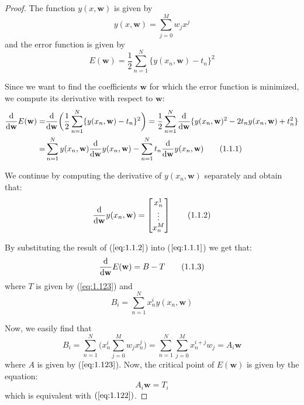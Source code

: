 \begin{proof}
    The function $y(x, \mathbf{w})$ is given by
    \begin{equation*}
        y(x, \mathbf{w}) = \sum_{j = 0}^M w_j x^j
        \tag{1.1}\label{eq:1.1}
    \end{equation*}
    and the error function is given by
    \begin{equation*}
        E(\mathbf{w}) = \frac{1}{2} \sum_{n = 1}^N \{y(x_n, \mathbf{w}) - t_n\}^2
        \tag{1.2}\label{eq:1.2}
    \end{equation*}

    Since we want to find the coefficients $\mathbf{w}$ for which
    the error function is minimized, we compute its derivative with
    respect to $\mathbf{w}$:
    \begin{align*}
        \dv{\mathbf{w}} E(\mathbf{w}) 
        =& \dv{\mathbf{w}} \bigg(\frac{1}{2} \sum_{n = 1}^N \{y(x_n, \mathbf{w}) - t_n\}^2\bigg)
        = \frac{1}{2} \sum_{n = 1}^{N} \dv{\mathbf{w}} \{y(x_n, \mathbf{w})^2 - 2t_ny(x_n, \mathbf{w}) + t_n^2\} \\
        =& \sum_{n = 1}^N y(x_n, \mathbf{w}) \dv{\mathbf{w}} y(x_n, \mathbf{w})
            - \sum_{n = 1}^N t_n \dv{\mathbf{w}} y(x_n, \mathbf{w}) \tag{1.1.1}\label{eq:1.1.1}
    \end{align*}

    We continue by computing the derivative of $y(x_n, \mathbf{w})$ separately and obtain that:
    \begin{equation*}
        \dv{\mathbf{w}} y(x_n, \mathbf{w}) 
        = \begin{bmatrix}
            x_n^1 \\
            \vdots \\
            x_n^M
        \end{bmatrix}
        \tag{1.1.2}\label{eq:1.1.2}
    \end{equation*}

    By substituting the result of ($\ref{eq:1.1.2}$) into ($\ref{eq:1.1.1}$) we get that:
    \begin{equation*}
        \dv{\mathbf{w}} E(\mathbf{w}) = B - T
        \tag{1.1.3}\label{eq:1.1.3}
    \end{equation*}
    where $T$ is given by (\ref{eq:1.123}) and
    \[
        B_i = \sum_{n = 1}^{N} x_n^i y(x_n, \mathbf{w})  
    \] 

    Now, we easily find that
    \[
        B_i = \sum_{n = 1}^{N} \bigg(x_n^i \sum_{j = 0}^M w_j x_n^j\bigg)
        = \sum_{n = 1}^{N} \sum_{j = 0}^M x_n^{i + j} w_j
        = A_i \mathbf{w}
    \] 
    where $A$ is given by ($\ref{eq:1.123}$). Now, the critical point of $E(\mathbf{w})$ 
    is given by the equation:
    \[
        A_i \mathbf{w} = T_i
    \] 
    which is equivalent with $(\ref{eq:1.122})$.
\end{proof}

